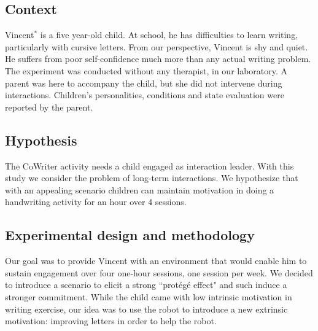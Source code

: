 \documentclass[conference]{IEEEtran}
\begin{document}
\subsection{Context}
Vincent$^*$ is a five year-old child. At school, he has difficulties to learn writing, particularly with cursive letters. From our perspective, Vincent is shy and quiet. He suffers from poor self-confidence much more than any actual writing problem. The experiment was conducted without any therapist, in our laboratory. A parent was here to accompany the child, but she did not intervene during interactions. Children's personalities, conditions and state evaluation were reported by the parent.

\subsection{Hypothesis}

The CoWriter activity needs a child engaged as interaction leader. 
With this study we consider the problem of long-term interactions. We hypothesize that with an appealing scenario children can maintain motivation in doing a handwriting activity for an hour over 4 sessions.

%

\subsection{Experimental design and methodology}

Our goal was to provide Vincent with
an environment that would enable him to sustain engagement over four one-hour sessions, 
one session per week. We decided to introduce a scenario to elicit a strong ``prot\'eg\'e effect" and such induce a stronger commitment. While the child came with low intrinsic motivation in writing exercise, our idea was to use the robot to introduce a new extrinsic motivation: improving letters in order to help the robot. 
\end{document}
